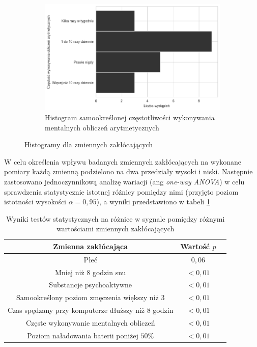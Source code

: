 \documentclass{./assets/wfis}
\begin{document}
\begin{figure}[h!]
\begin{subfigure}[b]{0.45\textwidth}
\end{subfigure}
\begin{subfigure}[b]{\textwidth}
\centering
    \includegraphics[width=0.75\columnwidth]{thesis/assets/mental_math.png}
    \caption{Histogram samookreślonej częstotliwości wykonywania mentalnych obliczeń arytmetycznych}
    \label{fig:arithmetic}
\end{subfigure}
\caption{Histogramy dla zmiennych zakłócających}
\end{figure}

W celu określenia wpływu badanych zmiennych zakłócających na wykonane pomiary każdą zmienną podzielono na dwa przedziały wysoki i niski. Następnie zastosowano jednoczynnikową analizę wariacji (ang \textit{one-way ANOVA}) w celu sprawdzenia statystycznie istotnej różnicy pomiędzy nimi (przyjęto poziom istotności wysokości $\alpha=0,95$), a wyniki przedstawiono w tabeli \ref{tab:confunding-variables-statistical-tests} 

\begin{table}[h!]
    \centering
    \begin{tabular}{|c|c|c|}
        \hline
          Zmienna zakłócająca & Wartość $p$\\
        \hline
         Płeć & $0,06 $\\
         Mniej niż $8$ godzin snu & $<0,01$ \\
         Substancje psychoaktywne  & $<0,01$ \\
         Samookreślony poziom zmęczenia większy niż $3$ & $<0,01$ \\
         Czas spędzany przy komputerze dłuższy niż 8 godzin & $<0,01$ \\
         Częste wykonywanie mentalnych obliczeń \footnotemark & $<0,01$ \\
         Poziom naładowania baterii poniżej $50\%$ & $<0,01$ \\
        \hline
    \end{tabular}
    \caption{Wyniki testów statystycznych na różnice w sygnale pomiędzy różnymi wartościami zmiennych zakłócających}
    \label{tab:confunding-variables-statistical-tests}
\end{table}
\end{document}
